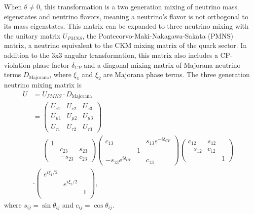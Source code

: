     When $\theta \neq 0$, this transformation is a two generation mixing of neutrino mass eigenstates and neutrino flavors, meaning a neutrino's flavor is not orthogonal to its mass eigenstates.
    This matrix can be expanded to three neutrino mixing with the unitary matrix $U_{PMNS}$, the Pontecorvo-Maki-Nakagawa-Sakata (PMNS) matrix, a neutrino equivalent to the CKM mixing matrix of the quark sector. 
    In addition to the 3x3 angular transformation, this matrix also includes a CP-violation phase factor $\delta_{CP}$ and a diagonal mixing matrix of Majorana neutrino terms $D_\textrm{Majorana}$, where $\xi_1$ and $\xi_2$ are Majorana phase terms. 
    The three generation neutrino mixing matrix is 
    \begin{equation}\label{eq16}
    \begin{aligned}
    U & =  U_{PMNS}\cdot D_\textrm{Majorana} \\
    & =  \left(\begin{array}{ccc}
    U_{e1} & U_{e2} & U_{e3} \\
    U_{\mu 1} & U_{\mu 2} & U_{\mu 3} \\
    U_{\tau 1} & U_{\tau 2} & U_{\tau 3}
    \end{array}\right) \\
    & = \left(\begin{array}{ccc}
    1   &   &  \\
        &   c_{23}  & s_{23} \\
        &   -s_{23} & c_{23}
    \end{array}\right) 
    \left(\begin{array}{ccc}
    c_{13}  &   & s_{13}e^{-i\delta_{CP}} \\
        & 1 &  \\
    -s_{13}e^{i\delta_{CP}}  &   & c_{13}
    \end{array}\right) 
    \left(\begin{array}{ccc}
    c_{12}  & s_{12}  &  \\
    -s_{12} & c_{12} &  \\
        &   & 1
    \end{array}\right)  \\
    &\cdot\left( \begin{array}{ccc}
    e^{i\xi_1/2} & & \\
    & e^{i\xi_2/2} & \\
    & & 1 \\
    \end{array}\right),
    \end{aligned}
    \end{equation}
    where $s_{ij} = \sin\theta_{ij}$ and  $c_{ij} = \cos\theta_{ij}$.

